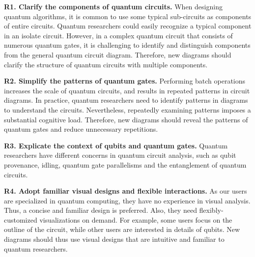 \textbf{R1. Clarify the components of quantum circuits.}
When designing quantum algorithms, it is common to use some typical sub-circuits as components of entire circuits.
Quantum researchers could easily recognize a typical component in an isolate circuit.
However, in a complex quantum circuit that consists of numerous quantum gates, it is challenging to identify and distinguish components from the general quantum circuit diagram.
Therefore, new diagrams should clarify the structure of quantum circuits with multiple components.

\textbf{R2. Simplify the patterns of quantum gates.}
Performing batch operations increases the scale of quantum circuits, and results in repeated patterns in circuit diagrams.
In practice, quantum researchers need to identify patterns in diagrams to understand the circuits.
Nevertheless, repeatedly examining patterns imposes a substantial cognitive load.
Therefore, new diagrams should reveal the patterns of quantum gates and reduce unnecessary repetitions.

\textbf{R3. Explicate the context of qubits and quantum gates.}
Quantum researchers have different concerns in quantum circuit analysis, such as qubit provenance\cite{Huang:2019:SAVA}, idling\cite{Das:2021:ADAPT}, quantum gate parallelisms\cite{Figgatt:2019:PEO} and the entanglement of quantum circuits\cite{Hubregtsen:2021:EPQC,JavadiAbhari:2014:ScaffCC}.

\textbf{R4. Adopt familiar visual designs and flexible interactions.}
As our users are specialized in quantum computing, they have no experience in visual analysis. 
Thus, a concise and familiar design is preferred.
Also, they need flexibly-customized visualizations on demand.
For example, some users focus on the outline of the circuit, while other users are interested in details of qubits.
New diagrams should thus use visual designs that are intuitive and familiar to quantum researchers.


